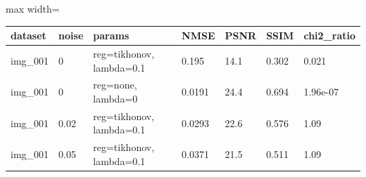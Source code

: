 \begin{center}\begin{minipage}{\linewidth}\centering
{}
\begin{adjustbox}{max width=\linewidth}
\begin{tabular}{lllllll}
\toprule
dataset & noise & params & NMSE & PSNR & SSIM & chi2\_ratio \\
\midrule
img\_001 & 0 & reg=tikhonov, lambda=0.1 & 0.195 & 14.1 & 0.302 & 0.021 \\
img\_001 & 0 & reg=none, lambda=0 & 0.0191 & 24.4 & 0.694 & 1.96e-07 \\
img\_001 & 0.02 & reg=tikhonov, lambda=0.1 & 0.0293 & 22.6 & 0.576 & 1.09 \\
img\_001 & 0.05 & reg=tikhonov, lambda=0.1 & 0.0371 & 21.5 & 0.511 & 1.09 \\
\bottomrule
\end{tabular}\end{adjustbox}\end{minipage}\end{center}
